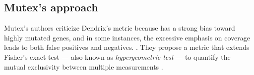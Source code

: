 \subsection{Mutex's approach}

Mutex's authors  criticize Dendrix's metric because has a strong bias toward highly mutated genes, and in some instances, the excessive emphasis on coverage leads to both false positives and negatives. . They propose a metric that extends Fisher's exact test --- also known as \textit{hypergeometric test} --- to quantify the mutual exclusivity between multiple measurements \cite{mutex}. 

\cleardoublepage
